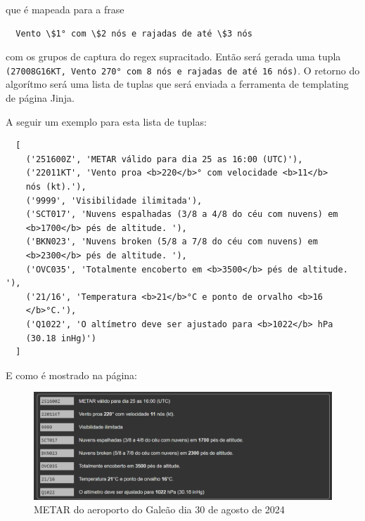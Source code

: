 que é mapeada para a frase

\begin{verbatim}
  Vento \$1° com \$2 nós e rajadas de até \$3 nós
\end{verbatim}

com os grupos de captura do regex supracitado. Então será gerada uma tupla
\texttt{(27008G16KT, Vento 270° com 8 nós e rajadas de até 16 nós)}. O retorno do 
algorítmo será uma lista de tuplas que será enviada a ferramenta de templating
de página Jinja.

A seguir um exemplo para esta lista de tuplas:

\begin{verbatim}
  [
    ('251600Z', 'METAR válido para dia 25 as 16:00 (UTC)'),
    ('22011KT', 'Vento proa <b>220</b>° com velocidade <b>11</b> 
    nós (kt).'),
    ('9999', 'Visibilidade ilimitada'),
    ('SCT017', 'Nuvens espalhadas (3/8 a 4/8 do céu com nuvens) em 
    <b>1700</b> pés de altitude. '),
    ('BKN023', 'Nuvens broken (5/8 a 7/8 do céu com nuvens) em 
    <b>2300</b> pés de altitude. '),
    ('OVC035', 'Totalmente encoberto em <b>3500</b> pés de altitude. '),
    ('21/16', 'Temperatura <b>21</b>°C e ponto de orvalho <b>16
    </b>°C.'),
    ('Q1022', 'O altímetro deve ser ajustado para <b>1022</b> hPa 
    (30.18 inHg)')
  ]
\end{verbatim}

E como é mostrado na página:

\begin{figure}[ht]
  \begin{center}
  \includegraphics[width=400pt]{img/metar-sbgl.png}
  \caption{METAR do aeroporto do Galeão dia 30 de agosto de 2024}
  \label{fig:metar-30-08}
  \end{center}
\end{figure}
